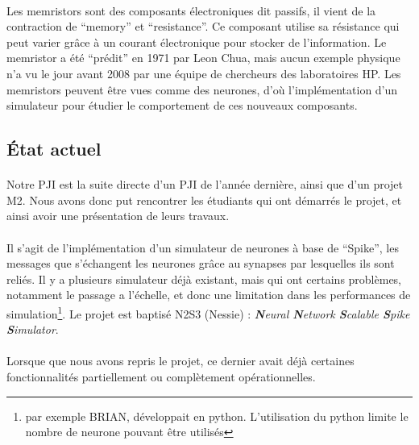 \documentclass[a4paper,10pt]{article}
\begin{document}
\paragraph{}
Les memristors sont des composants électroniques dit passifs, il vient de la contraction de “memory” et “resistance”. Ce composant utilise sa résistance qui peut varier grâce à un courant électronique pour stocker de l’information. Le memristor a été “prédit” en 1971 par Leon Chua, mais aucun exemple physique n’a vu le jour avant 2008 par une équipe de chercheurs des laboratoires HP. Les memristors peuvent être vues comme des neurones, d’où l’implémentation d’un simulateur pour étudier le comportement de ces nouveaux composants.

\newpage

\subsection{État actuel}

\paragraph{}
Notre PJI est la suite directe d’un PJI de l’année dernière, ainsi que d’un projet M2. Nous avons donc put rencontrer les étudiants qui ont démarrés le projet, et ainsi avoir une présentation de leurs travaux.

\paragraph{}
Il s’agit de l’implémentation d’un simulateur de neurones à base de “Spike”, les messages que s’échangent les neurones grâce au synapses par lesquelles ils sont reliés. Il y a plusieurs simulateur déjà existant, mais qui  ont certains problèmes, notamment le passage a l’échelle, et donc une limitation dans les performances de simulation\footnote{par exemple BRIAN, développait en python. L'utilisation du python limite le nombre de neurone pouvant être utilisés}. Le projet est baptisé N2S3 (Nessie) : \emph{\textbf{N}eural \textbf{N}etwork \textbf{S}calable
\textbf{S}pike \textbf{S}imulator}.

\paragraph{}
Lorsque que nous avons repris le projet, ce dernier avait déjà certaines fonctionnalités partiellement ou complètement opérationnelles.
\end{document}
